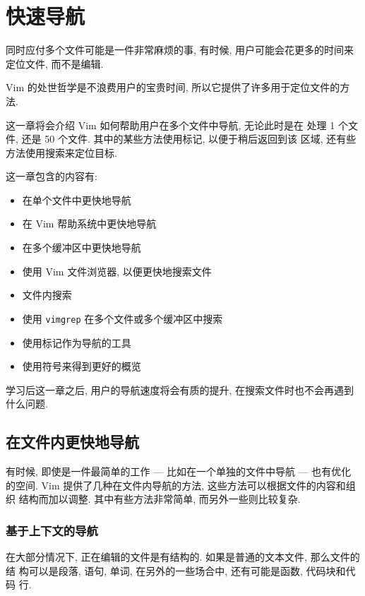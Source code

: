\chapter{快速导航}
\label{chap:better_navigation}
同时应付多个文件可能是一件非常麻烦的事, 有时候, 用户可能会花更多的时间来
定位文件, 而不是编辑.

Vim 的处世哲学是不浪费用户的宝贵时间, 所以它提供了许多用于定位文件的方法.

这一章将会介绍 Vim 如何帮助用户在多个文件中导航, 无论此时是在
处理 1 个文件, 还是 50 个文件. 其中的某些方法使用标记, 以便于稍后返回到该
区域, 还有些方法使用搜索来定位目标.

这一章包含的内容有:
\begin{itemize}
    \item 在单个文件中更快地导航
    \item 在 Vim 帮助系统中更快地导航
    \item 在多个缓冲区中更快地导航
    \item 使用 Vim 文件浏览器, 以便更快地搜索文件
    \item 文件内搜索
    \item 使用 \texttt{vimgrep} 在多个文件或多个缓冲区中搜索
    \item 使用标记作为导航的工具
    \item 使用符号来得到更好的概览
\end{itemize}

学习后这一章之后, 用户的导航速度将会有质的提升, 在搜索文件时也不会再遇到
什么问题.
\section{在文件内更快地导航}
\label{sec:faster_navigation_in_a_file}

有时候, 即使是一件最简单的工作 --- 比如在一个单独的文件中导航 --- 也有优化
的空间. Vim 提供了几种在文件内导航的方法, 这些方法可以根据文件的内容和组织
结构而加以调整. 其中有些方法非常简单, 而另外一些则比较复杂.

\subsection{基于上下文的导航}
\label{subsec:context_aware_navigation}

在大部分情况下, 正在编辑的文件是有结构的. 如果是普通的文本文件, 那么文件的结
构可以是段落, 语句, 单词, 在另外的一些场合中, 还有可能是函数, 代码块和代码
行.

